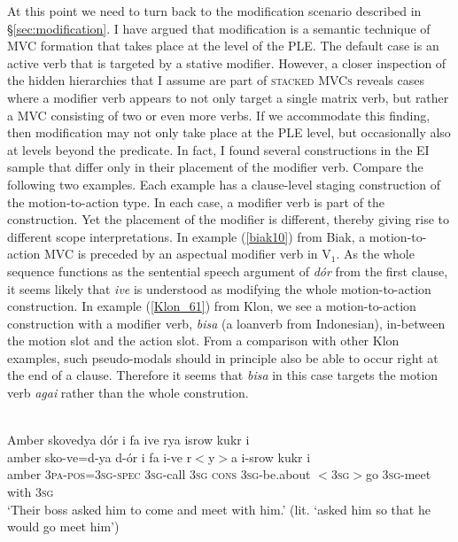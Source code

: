 At this point we need to turn back to the modification scenario described in §\ref{sec:modification}. I have argued that modification is a semantic technique of MVC formation that takes place at the level of the PLE. The default case is an active verb that is targeted by a stative modifier. However, a closer inspection of the hidden hierarchies that I assume are part of \textsc{stacked MVCs} reveals cases where a modifier verb appears to not only target a single matrix verb, but rather a MVC consisting of two or even more verbs. If we accommodate this finding, then modification may not only take place at the PLE level, but occasionally also at levels beyond the predicate. In fact, I found several constructions in the EI sample that differ only in their placement of the modifier verb. Compare the following two examples. Each example has a clause-level staging construction of the motion-to-action type. In each case, a modifier verb is part of the construction. Yet the placement of the modifier is different, thereby giving rise to different scope interpretations. In example (\ref{biak10}) from Biak, a motion-to-action MVC is preceded by an aspectual modifier verb in V$_1$. As the whole sequence functions as the sentential speech argument of \textit{dór} from the first clause, it seems likely that \textit{ive} is understood as modifying the whole motion-to-action construction. In example (\ref{Klon_61}) from Klon, we see a motion-to-action construction with a modifier verb, \textit{bisa} (a loanverb from Indonesian), in-between the motion slot and the action slot. From a comparison with other Klon examples, such pseudo-modals should in principle also be able to occur right at the end of a clause. Therefore it seems that \textit{bisa} in this case targets the motion verb \textit{agai} rather than the whole constrution.
 
\ea \label{biak10}
\\
\glll Amber skovedya dór i fa ive rya isrow kukr i \\
amber sko-ve=d-ya d-ór i fa i-ve r$<$y$>$a i-srow kukr i \\
amber 3\textsc{pa}-\textsc{pos}=3\textsc{sg}-\textsc{spec} 3\textsc{sg}-call 3\textsc{sg} \textsc{cons} 3\textsc{sg}-be.about $<$3\textsc{sg}$>$go 3\textsc{sg}-meet with 3\textsc{sg}\\
\glft `Their boss asked him to come and meet with him.' (lit. `asked him so that he
would go meet him') \\ 
\z

